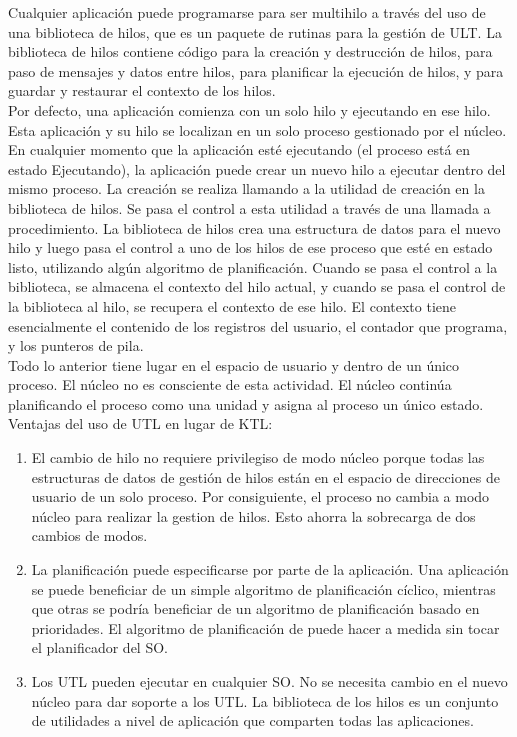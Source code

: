 \documentclass{article}
\begin{document}
					Cualquier aplicación puede programarse para ser multihilo a través del uso de una biblioteca de hilos, que es un paquete de rutinas para la gestión de ULT. La biblioteca de hilos contiene código para la creación y destrucción de hilos, para paso de mensajes y datos entre hilos, para planificar la ejecución de hilos, y para guardar y restaurar el contexto de los hilos. \\
					
					Por defecto, una aplicación comienza con un solo hilo y ejecutando en ese hilo. Esta aplicación y su hilo se localizan en un solo proceso gestionado por el núcleo. En cualquier momento que la aplicación esté ejecutando (el proceso está en estado Ejecutando), la aplicación puede crear un nuevo hilo a ejecutar dentro del mismo proceso. La creación se realiza llamando a la utilidad de creación en la biblioteca de hilos. Se pasa el control a esta utilidad a través de una llamada a procedimiento. La biblioteca de hilos crea una estructura de datos para el nuevo hilo y luego pasa el control a uno de los hilos de ese proceso que esté en estado listo, utilizando algún algoritmo de planificación. Cuando se pasa el
control a la biblioteca, se almacena el contexto del hilo actual, y cuando se pasa el control de la biblioteca al hilo, se recupera el contexto de ese hilo. El contexto tiene esencialmente el contenido de los registros del usuario, el contador que programa, y los punteros de pila. \\

					Todo lo anterior tiene lugar en el espacio de usuario y dentro de un único proceso. El núcleo no es consciente de esta actividad. El núcleo continúa planificando el proceso como una unidad y asigna al proceso un único estado. \\
					
					Ventajas del uso de UTL en lugar de KTL:
					
					\begin{enumerate}
					\item El cambio de hilo no requiere privilegiso de modo núcleo porque todas las estructuras de datos de gestión de hilos están en el espacio de direcciones de usuario de un solo proceso. Por consiguiente, el proceso no cambia a modo núcleo para realizar la gestion de hilos. Esto ahorra la sobrecarga de dos cambios de modos.
					\item La planificación puede especificarse por parte de la aplicación. Una aplicación se puede beneficiar de un simple algoritmo de planificación cíclico, mientras que otras se podría beneficiar de un algoritmo de planificación basado en prioridades. El algoritmo de planificación de puede hacer a medida sin tocar el planificador del SO.
					\item Los UTL pueden ejecutar en cualquier SO. No se necesita cambio en el nuevo núcleo para dar soporte a los UTL. La biblioteca de los hilos es un conjunto de utilidades a nivel de aplicación que comparten todas las aplicaciones.
					\end{enumerate}
					
\end{document}
